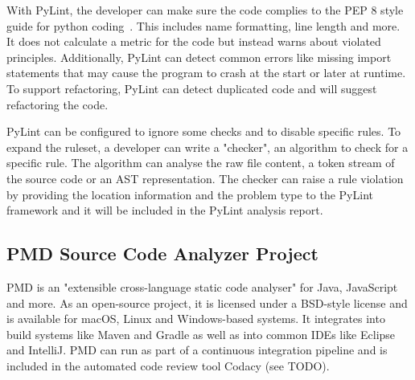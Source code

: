 With PyLint, the developer can make sure the code complies to the PEP 8 style guide for python coding~\cite{pep8}. This includes name formatting, line length and more. It does not calculate a metric for the code but instead warns about violated principles. Additionally, PyLint can detect common errors like missing import statements that may cause the program to crash at the start or later at runtime. To support refactoring, PyLint can detect duplicated code and will suggest refactoring the code.

PyLint can be configured to ignore some checks and to disable specific rules. To expand the ruleset, a developer can write a "checker", an algorithm to check for a specific rule. The algorithm can analyse the raw file content, a token stream of the source code or an AST representation. The checker can raise a rule violation by providing the location information and the problem type to the PyLint framework and it will be included in the PyLint analysis report.

\subsection{PMD Source Code Analyzer Project}
PMD is an "extensible cross-language static code analyser" for Java, JavaScript and more. As an open-source project, it is licensed under a BSD-style license and is available for macOS, Linux and Windows-based systems. It integrates into build systems like Maven and Gradle as well as into common IDEs like Eclipse and IntelliJ. PMD can run as part of a continuous integration pipeline and is included in the automated code review tool Codacy (see TODO).


